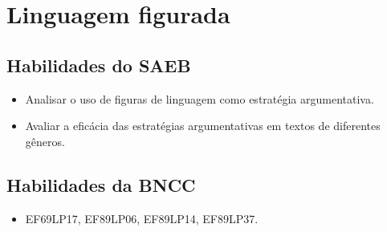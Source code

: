 \chapter{Linguagem figurada}

\section{Habilidades do SAEB}

\begin{itemize}
\item Analisar o uso de figuras de linguagem como estratégia argumentativa.

\item Avaliar a eficácia das estratégias argumentativas em textos de
diferentes gêneros.
\end{itemize}

\section*{Habilidades da BNCC}

\begin{itemize}
\item EF69LP17, EF89LP06, EF89LP14, EF89LP37.
\end{itemize}

